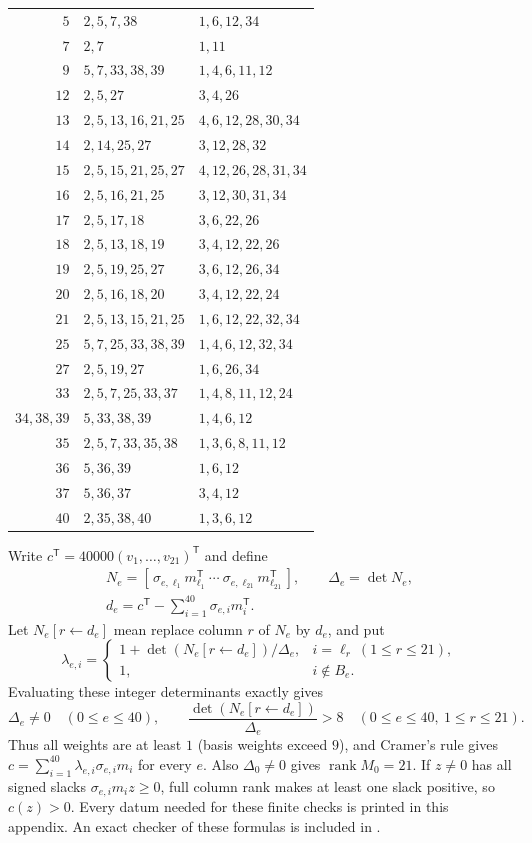\documentclass[11pt]{article}
\theoremstyle{remark}
\begin{document}
\begin{appendices}
\begin{center}
\begin{tabular}{r|l|l}
$5$&$2,5,7,38$&$1,6,12,34$\\
$7$&$2,7$&$1,11$\\
$9$&$5,7,33,38,39$&$1,4,6,11,12$\\
$12$&$2,5,27$&$3,4,26$\\
$13$&$2,5,13,16,21,25$&$4,6,12,28,30,34$\\
$14$&$2,14,25,27$&$3,12,28,32$\\
$15$&$2,5,15,21,25,27$&$4,12,26,28,31,34$\\
$16$&$2,5,16,21,25$&$3,12,30,31,34$\\
$17$&$2,5,17,18$&$3,6,22,26$\\
$18$&$2,5,13,18,19$&$3,4,12,22,26$\\
$19$&$2,5,19,25,27$&$3,6,12,26,34$\\
$20$&$2,5,16,18,20$&$3,4,12,22,24$\\
$21$&$2,5,13,15,21,25$&$1,6,12,22,32,34$\\
$25$&$5,7,25,33,38,39$&$1,4,6,12,32,34$\\
$27$&$2,5,19,27$&$1,6,26,34$\\
$33$&$2,5,7,25,33,37$&$1,4,8,11,12,24$\\
$34,38,39$&$5,33,38,39$&$1,4,6,12$\\
$35$&$2,5,7,33,35,38$&$1,3,6,8,11,12$\\
$36$&$5,36,39$&$1,6,12$\\
$37$&$5,36,37$&$3,4,12$\\
$40$&$2,35,38,40$&$1,3,6,12$\\
\end{tabular}
\end{center}
Write $c^{\mathsf T}=40000(v_1,\ldots,v_{21})^{\mathsf T}$ and define
\[
 \begin{gathered}
 N_e=[\,\sigma_{e,\ell_1}m_{\ell_1}^{\mathsf T}\ \cdots\
       \sigma_{e,\ell_{21}}m_{\ell_{21}}^{\mathsf T}\,],\qquad \Delta_e=\det N_e,\\
 d_e=c^{\mathsf T}-\sum_{i=1}^{40}\sigma_{e,i}m_i^{\mathsf T}.
 \end{gathered}
\]
Let $N_e[r\leftarrow d_e]$ mean replace column $r$ of $N_e$ by $d_e$, and put
\[
 \lambda_{e,i}=\begin{cases}
 1+\det(N_e[r\leftarrow d_e])/\Delta_e,&i=\ell_r\ (1\le r\le21),\\
 1,&i\notin B_e.
 \end{cases}
\]
Evaluating these integer determinants exactly gives
\[
 \Delta_e\ne0\quad(0\le e\le40),\qquad
 \frac{\det(N_e[r\leftarrow d_e])}{\Delta_e}>8
 \quad(0\le e\le40,\ 1\le r\le21).
\]
Thus all weights are at least $1$ (basis weights exceed $9$), and Cramer's rule gives
$c=\sum_{i=1}^{40}\lambda_{e,i}\sigma_{e,i}m_i$ for every $e$.
Also $\Delta_0\ne0$ gives $\operatorname{rank}M_0=21$. If $z\ne0$ has all
signed slacks $\sigma_{e,i}m_i z\ge0$, full column rank makes at least one
slack positive, so $c(z)>0$. Every datum needed for these finite checks is
printed in this appendix. An exact checker of these formulas is included
in \cite{supplement}.


\end{appendices}
\end{document}
